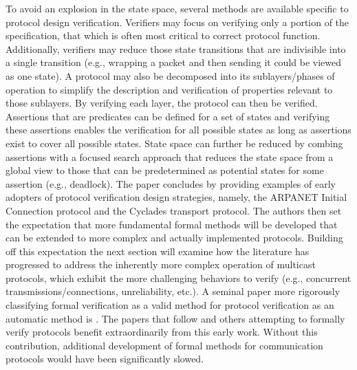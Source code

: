 \documentclass[12pt, fullpage]{article}
\begin{document}
\bigbreak
To avoid an explosion in the state space, several methods are available specific to protocol design verification. Verifiers may focus on verifying only a portion of the specification, that which is often most critical to correct protocol function. Additionally, verifiers may reduce those state transitions that are indivisible into a single transition (e.g., wrapping a packet and then sending it could be viewed as one state). A protocol may also be decomposed into its sublayers/phases of operation to simplify the description and verification of properties relevant to those sublayers. By verifying each layer, the protocol can then be verified. Assertions that are predicates can be defined for a set of states and verifying these assertions enables the verification for all possible states as long as assertions exist to cover all possible states. State space can further be reduced by combing assertions with a focused search approach that reduces the state space from a global view to those that can be predetermined as potential states for some assertion (e.g., deadlock). 
\bigbreak
The paper concludes by providing examples of early adopters of protocol verification design strategies, namely, the ARPANET Initial Connection protocol and the Cyclades transport protocol. The authors then set the expectation that more fundamental formal methods will be developed that can be extended to more complex and actually implemented protocols. Building off this expectation the next section will examine how the literature has progressed to address the inherently more complex operation of multicast protocols, which exhibit the more challenging behaviors to verify (e.g., concurrent transmissions/connections, unreliability, etc.).
\bigbreak
A seminal paper more rigorously classifying formal verification as a valid method for protocol verification as an automatic method is \cite{Holzmann1990}. The papers that follow and others attempting to formally verify protocols benefit extraordinarily from this early work. Without this contribution, additional development of formal methods for communication protocols would have been significantly slowed.
\bigbreak
\end{document}
